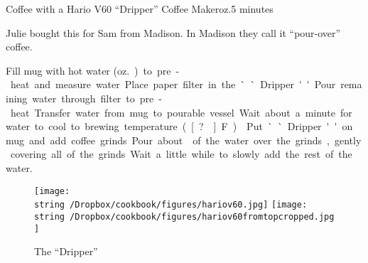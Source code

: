\begin{recipe}{Coffee with a Hario V60\tm{} ``Dripper'' Coffee Maker}{\unit[6--8]{oz.}}{5 minutes}

\freeform Julie bought this for Sam from Madison.  In Madison they
call it ``pour-over'' coffee.

 Fill mug with hot water
(\unit[6--8]{oz.}) to pre-heat and measure water.  Place paper filter in the
``Dripper.'' Pour remaining water through filter to pre-heat.
Transfer water from mug to pourable vessel.  Wait about a minute for water to cool to brewing temperature (\unit[?\0]{F}).

 Put ``Dripper'' on mug and add coffee
grinds.  Pour about  of the water over the grinds, gently
covering all of the grinds.  Wait a little while to slowly add the
rest of the water.

\end{recipe}
\begin{figure}[b!]
\begin{center}
\texttt{[image: \\string~/Dropbox/cookbook/figures/hariov60.jpg]}
\hspace{0.1\textwidth}
\texttt{[image: \\string~/Dropbox/cookbook/figures/hariov60fromtopcropped.jpg]}
\end{center}
\caption*{The ``Dripper'' }
\end{figure}
